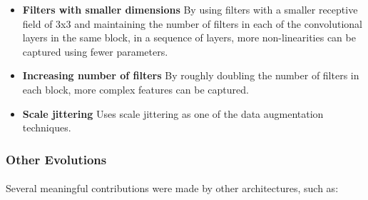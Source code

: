 \begin{itemize}
    \item \textbf{Filters with smaller dimensions} By using filters with a smaller receptive field of 3x3 and maintaining the number of filters in each of the convolutional layers in the same block, in a sequence of layers, more non-linearities can be captured using fewer parameters.
 
    \item \textbf{Increasing number of filters} By roughly doubling the number of filters in each block, more complex features can be captured.
    \item \textbf{Scale jittering} Uses scale jittering as one of the data augmentation techniques.

\end{itemize}

\subsubsection{Other Evolutions}
\paragraph{}
Several meaningful contributions were made by other architectures, such as:

